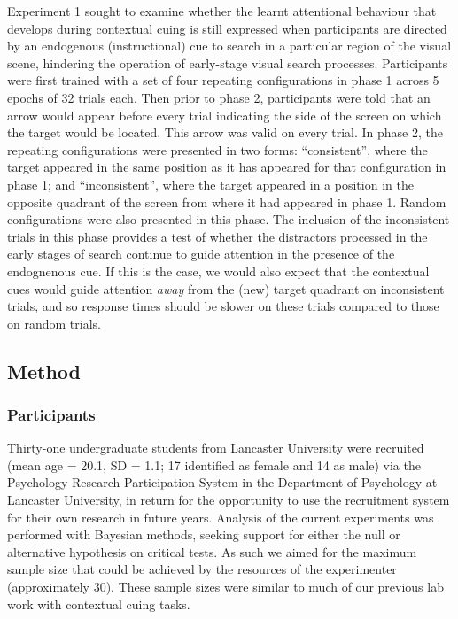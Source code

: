\documentclass[
  man,
  floatsintext,
  longtable,
  nolmodern,
  notxfonts,
  notimes,
  colorlinks=true,linkcolor=blue,citecolor=blue,urlcolor=blue]{apa7}
\begin{document}
Experiment 1 sought to examine whether the learnt attentional behaviour
that develops during contextual cuing is still expressed when
participants are directed by an endogenous (instructional) cue to search
in a particular region of the visual scene, hindering the operation of
early-stage visual search processes. Participants were first trained
with a set of four repeating configurations in phase 1 across 5 epochs
of 32 trials each. Then prior to phase 2, participants were told that an
arrow would appear before every trial indicating the side of the screen
on which the target would be located. This arrow was valid on every
trial. In phase 2, the repeating configurations were presented in two
forms: ``consistent'', where the target appeared in the same position as
it has appeared for that configuration in phase 1; and ``inconsistent'',
where the target appeared in a position in the opposite quadrant of the
screen from where it had appeared in phase 1. Random configurations were
also presented in this phase. The inclusion of the inconsistent trials
in this phase provides a test of whether the distractors processed in
the early stages of search continue to guide attention in the presence
of the endognenous cue. If this is the case, we would also expect that
the contextual cues would guide attention \emph{away} from the (new)
target quadrant on inconsistent trials, and so response times should be
slower on these trials compared to those on random trials.

\subsection{Method}\label{method}

\subsubsection{Participants}\label{participants}

Thirty-one undergraduate students from Lancaster University were
recruited (mean age = 20.1, SD = 1.1; 17 identified as female and 14 as
male) via the Psychology Research Participation System in the Department
of Psychology at Lancaster University, in return for the opportunity to
use the recruitment system for their own research in future years.
Analysis of the current experiments was performed with Bayesian methods,
seeking support for either the null or alternative hypothesis on
critical tests. As such we aimed for the maximum sample size that could
be achieved by the resources of the experimenter (approximately 30).
These sample sizes were similar to much of our previous lab work with
contextual cuing tasks.
\end{document}
